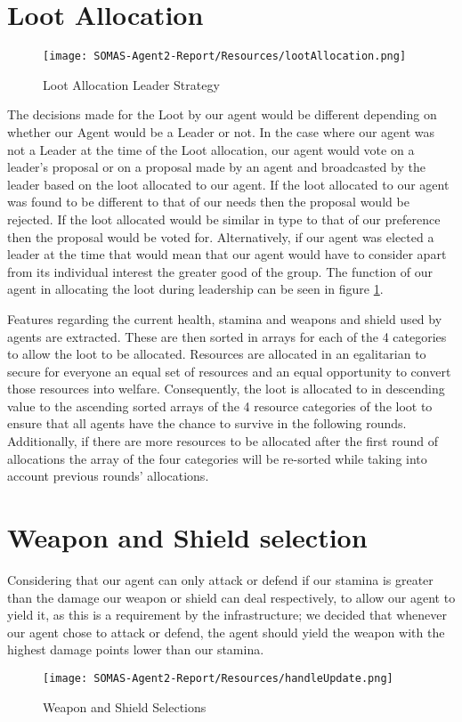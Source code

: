 \section{Loot Allocation}

\begin{figure}[!ht]
    \centering
    \texttt{[image: SOMAS-Agent2-Report/Resources/lootAllocation.png]}
    \caption{Loot Allocation Leader Strategy}
    \label{fig:loot}
\end{figure}
The decisions made for the Loot by our agent would be different depending on whether our Agent would be a Leader or not. In the case where our agent was not a Leader at the time of the Loot allocation, our agent would vote on a leader's proposal or on a proposal made by an agent and broadcasted by the leader based on the loot allocated to our agent. If the loot allocated to our agent was found to be different to that of our needs then the proposal would be rejected. If the loot allocated would be similar in type to that of our preference then the proposal would be voted for.
Alternatively, if our agent was elected a leader at the time that would mean that our agent would have to consider apart from its individual interest the greater good of the group. The function of our agent in allocating the loot during leadership can be seen in figure \ref{fig:loot}.

Features regarding the current health, stamina and weapons and shield used by agents are extracted. These are then sorted in arrays for each of the 4 categories to allow the loot to be allocated. Resources are allocated in an egalitarian to secure for everyone an equal set of resources and an equal opportunity to convert those resources into welfare. Consequently, the loot is allocated to in descending value to the ascending sorted arrays of the 4 resource categories of the loot to ensure that all agents have the chance to survive in the following rounds.
Additionally, if there are more resources to be allocated after the first round of allocations the array of the four categories will be re-sorted while taking into account previous rounds' allocations.

\section{Weapon and Shield selection}
Considering that our agent can only attack or defend if our stamina is greater than the damage our weapon or shield can deal respectively, to allow our agent to yield it, as this is a requirement by the infrastructure; we decided that whenever our agent chose to attack or defend, the agent should yield the weapon with the highest damage points lower than our stamina. 
\begin{figure}[!ht]
    \centering
    \texttt{[image: SOMAS-Agent2-Report/Resources/handleUpdate.png]}
    \caption{Weapon and Shield Selections}
    \label{fig:handleUpdate}
\end{figure}


